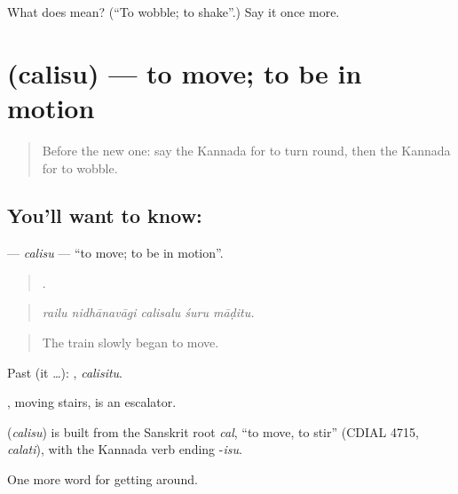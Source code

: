 \begin{tcolorbox}[breakable,colback=teal!4,colframe=teal!35!black,title={Before you move on}]
What does  mean? (\textquotedblleft{}To wobble; to shake\textquotedblright{}.) Say it once more.
\end{tcolorbox}
\section[\texorpdfstring{\kn{ಚಲಿಸು} (calisu)}{ಚಲಿಸು (calisu)}]{ (calisu) — to move; to be in motion}

\label{lesson:KA-C445-calisu}



\begin{quote}
Before the new one: say the Kannada for to turn round, then the Kannada for to wobble.
\end{quote}

\subsection*{You'll want to know: }
\textbf{} — \emph{calisu} — \textquotedblleft{}to move; to be in motion\textquotedblright{}.

\begin{quote}
    .
\end{quote}

\begin{quote}
\emph{railu nidhānavāgi calisalu śuru māḍitu.}
\end{quote}

\begin{quote}
The train slowly began to move.
\end{quote}

Past (it …): , \emph{calisitu}.

 , moving stairs, is an escalator.

\begin{cousinweb}
\textbf{} (\emph{calisu}) is built from the Sanskrit root \emph{cal}, \textquotedblleft{}to move, to stir\textquotedblright{} (CDIAL 4715, \emph{calati}), with the Kannada verb ending -\emph{isu}.
\end{cousinweb}

\begin{grammarlens}[title={What you've built}]
One more word for getting around.
\end{grammarlens}

